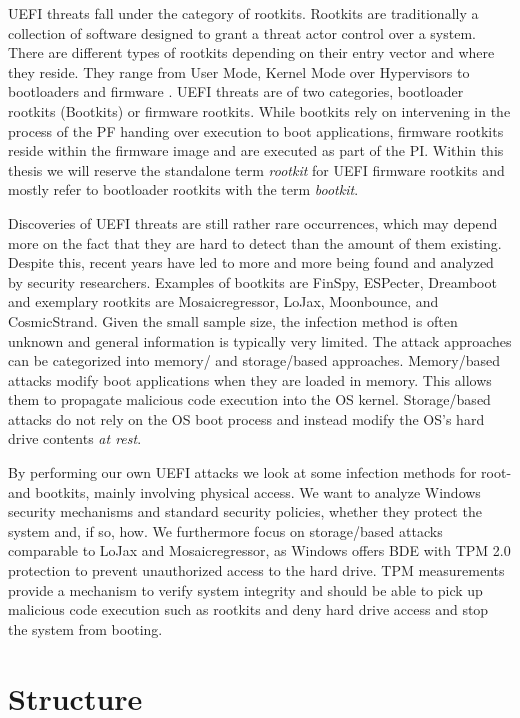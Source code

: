 \ac{UEFI} threats fall under the category of rootkits.
Rootkits are traditionally a collection of software designed to grant a threat actor control over a system.
There are different types of rootkits depending on their entry vector and where they reside.
They range from User Mode, Kernel Mode over Hypervisors to bootloaders and firmware \cite{crowdstrike, techtarget, microsoft-secure-the-windows-boot-process}.
\ac{UEFI} threats are of two categories, bootloader rootkits (Bootkits) or firmware rootkits.
While bootkits rely on intervening in the process of the \ac{PF} handing over execution to boot applications, firmware rootkits reside within the firmware image and are executed as part of the \ac{PI}.
Within this thesis we will reserve the standalone term \emph{rootkit} for \ac{UEFI} firmware rootkits and mostly refer to bootloader rootkits with the term \emph{bootkit}.

Discoveries of \ac{UEFI} threats are still rather rare occurrences, which may depend more on the fact that they are hard to detect than the amount of them existing.
Despite this, recent years have led to more and more being found and analyzed by security researchers.
Examples of bootkits are FinSpy, ESPecter, Dreamboot and exemplary rootkits are Mosaicregressor, LoJax, Moonbounce, and CosmicStrand.
Given the small sample size, the infection method is often unknown and general information is typically very limited.
The attack approaches can be categorized into memory\-/ and storage\-/based approaches.
Memory\-/based attacks modify boot applications when they are loaded in memory.
This allows them to propagate malicious code execution into the \ac{OS} kernel.
Storage\-/based attacks do not rely on the \ac{OS} boot process and instead modify the \ac{OS}'s hard drive contents \emph{at rest}.

By performing our own \ac{UEFI} attacks we look at some infection methods for root- and bootkits, mainly involving physical access.
We want to analyze Windows security mechanisms and standard security policies, whether they protect the system and, if so, how.
We furthermore focus on storage\-/based attacks comparable to LoJax and Mosaicregressor, as Windows offers \ac{BDE} with \ac{TPM} 2.0 protection to prevent unauthorized access to the hard drive.
\ac{TPM} measurements provide a mechanism to verify system integrity and should be able to pick up malicious code execution such as rootkits and deny hard drive access and stop the system from booting.

\section*{Structure}

